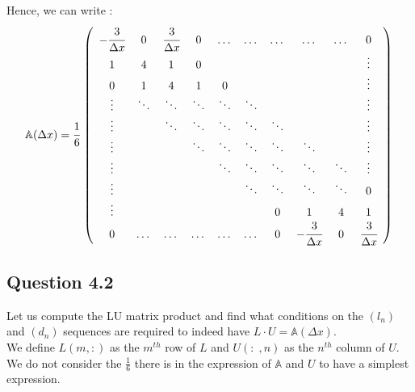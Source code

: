 \documentclass[10pt]{article}
\begin{document}
Hence, we can write :
$$
\mathbb{A}(\Delta x) = \cfrac{1}{6}\,\left(
\begin{array}{cccccccccc}
-\cfrac{3}{\Delta x} & 0      & \cfrac{3}{\Delta x} & 0      & \dots  & \dots  & \dots  & \dots                & \dots  & 0 \\
1                    & 4      & 1                   & 0      &        &        &        &                      &        & \vdots \\
0                    & 1      & 4                   & 1      & 0      &        &        &                      &        & \vdots \\
\vdots               & \ddots & \ddots              & \ddots & \ddots & \ddots &        &                      &        & \vdots \\
\vdots               &        & \ddots              & \ddots & \ddots & \ddots & \ddots &                      &        & \vdots \\
\vdots               &        &                     & \ddots & \ddots & \ddots & \ddots & \ddots               &        & \vdots \\
\vdots               &        &                     &        & \ddots & \ddots & \ddots & \ddots               & \ddots & \vdots \\
\vdots               &        &                     &        &        & \ddots & \ddots & \ddots               & \ddots & 0 \\
\vdots               &        &                     &        &        &        & 0      & 1                    & 4      & 1 \\
0                    & \dots  & \dots               & \dots  & \dots  & \dots  & 0      & -\cfrac{3}{\Delta x} & 0      & \cfrac{3}{\Delta x}
\end{array}
\right) \,
$$


\subsection{Question 4.2}


Let us compute the LU matrix product and find what conditions on the $(l_n)$ and $(d_n)$ sequences are required to indeed have $L \cdot U =\mathbb{A}(\Delta x)$.\\

We define $L(m,:)$ as the $m^{th}$ row of $L$ and $U(:\;,n)$ as the $n^{th}$ column of $U$.\\

We do not consider the $\frac{1}{6}$ there is in the expression of $\mathbb{A}$ and $U$ to have a simplest expression. \\
\end{document}
